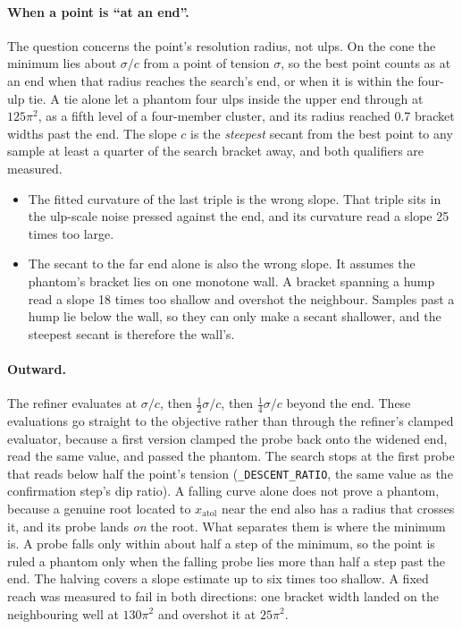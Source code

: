 \documentclass[11pt]{article}
\theoremstyle{definition}
\theoremstyle{remark}
\newcommand{\code}[1]{\texttt{#1}}
\newcommand{\sig}{\sigma}
\begin{document}
\paragraph{When a point is ``at an end''.} The question concerns the point's resolution
radius, not ulps. On the cone the minimum lies about $\sig/c$ from a point of tension $\sig$, so
the best point counts as at an end when that radius reaches the search's end, or when it is
within the four-ulp tie. A tie alone let a phantom four ulps inside the upper end through at
$125\pi^2$, as a fifth level of a four-member cluster, and its radius reached 0.7 bracket
widths past the end. The slope $c$ is the \emph{steepest} secant from the best point to any
sample at least a quarter of the search bracket away, and both qualifiers are measured.
\begin{itemize}
\item The fitted curvature of the last triple is the wrong slope. That triple sits in the
ulp-scale noise pressed against the end, and its curvature read a slope 25 times too large.
\item The secant to the far end alone is also the wrong slope. It assumes the phantom's
bracket lies on one monotone wall. A bracket spanning a hump read a slope 18 times too shallow
and overshot the neighbour. Samples past a hump lie below the wall, so they can only make a
secant shallower, and the steepest secant is therefore the wall's.
\end{itemize}

\paragraph{Outward.} The refiner evaluates at $\sig/c$, then $\tfrac12\sig/c$, then
$\tfrac14\sig/c$ beyond the end. These evaluations go straight to the objective rather than
through the refiner's clamped evaluator, because a first version clamped the probe back onto
the widened end, read the same value, and passed the phantom. The search stops at the first
probe that reads below half the point's tension (\code{\_DESCENT\_RATIO}, the same value as the
confirmation step's dip ratio). A falling curve alone does not prove a phantom, because a
genuine root located to $x_{\text{atol}}$ near the end also has a radius that crosses it, and
its probe lands \emph{on} the root. What separates them is where the minimum is. A probe falls
only within about half a step of the minimum, so the point is ruled a phantom only when the
falling probe lies more than half a step past the end. The halving covers a slope estimate up
to six times too shallow. A fixed reach was measured to fail in both directions: one bracket
width landed on the neighbouring well at $130\pi^2$ and overshot it at $25\pi^2$.
\end{document}

